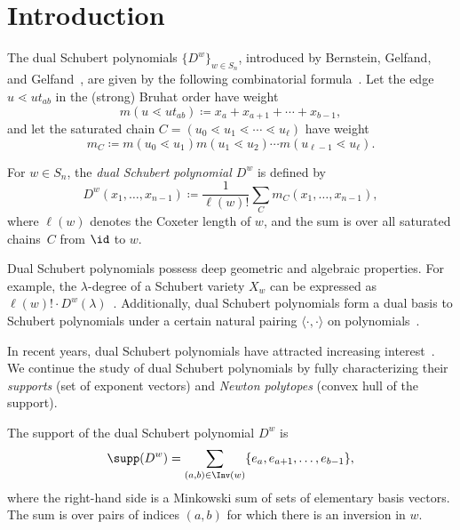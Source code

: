 \section{Introduction}
The dual Schubert polynomials $\{D^w\}_{w\in S_{n}}$, introduced by Bernstein, Gelfand, and Gelfand~\cite{BGG}, are given by the following combinatorial formula~\cite{PostnikovStanley}. Let the edge $u \lessdot ut_{ab}$ in the (strong) Bruhat order have weight 
\[m(u \lessdot ut_{ab}) \coloneqq x_a + x_{a+1} + \cdots + x_{b-1},\] 
and let the saturated chain $C = (u_0 \lessdot u_1\lessdot\cdots \lessdot u_{\ell})$ have weight 
\[m_C\coloneq m(u_0 \lessdot u_1)m(u_1 \lessdot u_2)\cdots m(u_{\ell - 1} \lessdot u_{\ell}).\]

\begin{defi}\label{def:dualSchubert}
    For $w \in S_n$, the \emph{dual Schubert polynomial $D^w$} is defined by \[D^w(x_1, \dots,x_{n-1}) \coloneqq \frac{1}{\ell(w)!} \sum_C m_C(x_1, \dots,x_{n-1}),\] where $\ell(w)$ denotes the Coxeter length of $w$, and the sum is over all saturated chains~$C$ from $\id$ to $w$.
\end{defi}

Dual Schubert polynomials possess deep geometric and algebraic properties. For example, the $\lambda$-degree of a Schubert variety $X_w$ can be expressed as $\ell(w)! \cdot D^w(\lambda)$~\cite{PostnikovStanley}. Additionally, dual Schubert polynomials form a dual basis to Schubert polynomials under a certain natural pairing $\langle \cdot, \cdot \rangle$ on polynomials~\cite{PostnikovStanley}. 

In recent years, dual Schubert polynomials have attracted increasing interest~\cite{InvolRC, Hamaker,HuhMeszaroLorSchur}. We continue the study of dual Schubert polynomials by fully characterizing their \emph{supports} (set of exponent vectors) and \emph{Newton polytopes} (convex hull of the support).

\begin{theorem}\label{theorem:support}
    The support of the dual Schubert polynomial $D^w$ is
    \[\supp (D^w)= \sum_{(a,b) \in \Inv(w)}\{e_a, e_{a+1}, \dots, e_{b-1}\},\]
    where the right-hand side is a Minkowski sum of sets of elementary basis vectors. The sum is over pairs of indices $(a, b)$ for which there is an inversion in $w$.
\end{theorem}

